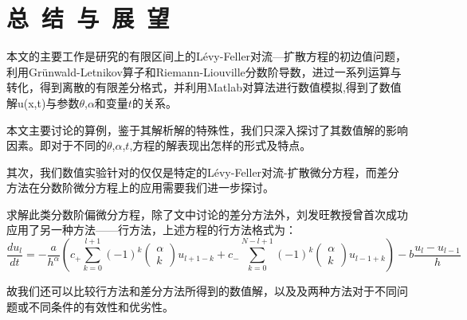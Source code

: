 \chapter{总~结~与~展~望}%

本文的主要工作是研究的有限区间上的Lévy-Feller对流—扩散方程的初边值问题，利用Grünwald-Letnikov算子和Riemann-Liouville分数阶导数，进过一系列运算与转化，得到离散的有限差分格式，并利用Matlab对算法进行数值模拟,得到了数值解u(x,t)与参数$\theta$,$\alpha$和变量$t$的关系。

本文主要讨论的算例，鉴于其解析解的特殊性，我们只深入探讨了其数值解的影响因素。即对于不同的$\theta$,$\alpha$,$t$,方程的解表现出怎样的形式及特点。

其次，我们数值实验针对的仅仅是特定的Lévy-Feller对流-扩散微分方程，而差分方法在分数阶微分方程上的应用需要我们进一步探讨。

求解此类分数阶偏微分方程，除了文中讨论的差分方法外，刘发旺教授曾首次成功应用了另一种方法——行方法，上述方程的行方法格式为：$$
\frac{d u_{l}}{d t}=-\frac{a}{h^{\alpha}}\left(c_{+} \sum_{k=0}^{l+1}(-1)^{k} \left( \begin{array}{c}{\alpha} \\ {k}\end{array}\right) u_{l+1-k}+c_{-} \sum_{k=0}^{N-l+1}(-1)^{k} \left( \begin{array}{c}{\alpha} \\ {k}\end{array}\right) u_{l-1+k}\right)-b \frac{u_{l}-u_{l-1}}{h}
$$

故我们还可以比较行方法和差分方法所得到的数值解，以及及两种方法对于不同问题或不同条件的有效性和优劣性。




